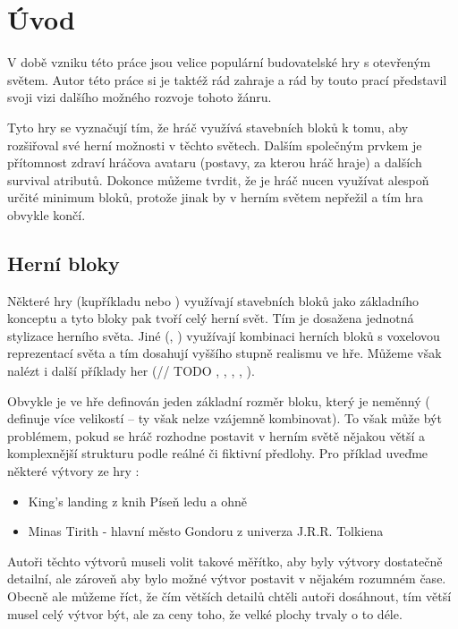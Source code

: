 
\chapter{Úvod}

V době vzniku této práce jsou velice populární budovatelské hry s otevřeným světem. Autor této práce si je taktéž rád zahraje a rád by touto prací představil svoji vizi dalšího možného rozvoje tohoto žánru.

Tyto hry se vyznačují tím, že hráč využívá stavebních bloků k tomu, aby rozšiřoval své herní možnosti v těchto světech. Dalším společným prvkem je přítomnost zdraví hráčova avataru (postavy, za kterou hráč hraje) a dalších survival atributů. Dokonce můžeme tvrdit, že je hráč nucen využívat alespoň určité minimum bloků, protože jinak by v herním světem nepřežil a tím hra obvykle končí.

\section{Herní bloky}

Některé hry (kupříkladu \MC{} nebo \TE{}) využívají stavebních bloků jako základního konceptu a tyto bloky pak tvoří celý herní svět. Tím je dosažena jednotná stylizace herního světa. Jiné (\SE{}, \ME{}) využívají kombinaci herních bloků s voxelovou reprezentací světa a tím dosahují vyššího stupně realismu ve hře.
Můžeme však nalézt i další příklady her (// TODO \TM{}, \NI{}, \PN{}, \ARK{}, \NMS{}).

Obvykle je ve hře definován jeden základní rozměr bloku, který je neměnný (\SE{} definuje více velikostí -- ty však nelze vzájemně kombinovat). To však může být problémem, pokud se hráč rozhodne postavit v herním světě nějakou větší a komplexnější strukturu podle reálné či fiktivní předlohy. Pro příklad uveďme některé výtvory ze hry \MC{}:
\begin{itemize}
	\item King's landing z knih Píseň ledu a ohně
	\item Minas Tirith - hlavní město Gondoru z univerza J.R.R. Tolkiena
\end{itemize}

Autoři těchto výtvorů museli volit takové měřítko, aby byly výtvory dostatečně detailní, ale zároveň aby bylo možné výtvor postavit v nějakém rozumném čase. Obecně ale můžeme říct, že čím větších detailů chtěli autoři dosáhnout, tím větší musel celý výtvor být, ale za ceny toho, že velké plochy trvaly o to déle.

